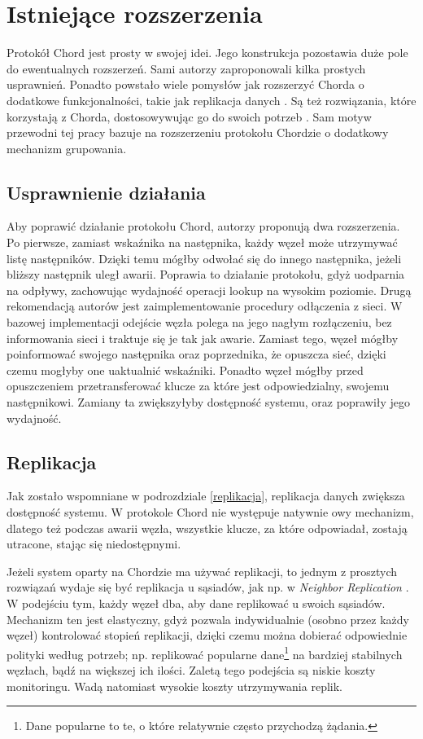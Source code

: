 \documentclass[12pt, twoside, openany]{report}
\begin{document}
\section{Istniejące rozszerzenia}

Protokół Chord jest prosty w swojej idei. Jego konstrukcja pozostawia duże pole do ewentualnych rozszerzeń. Sami autorzy zaproponowali kilka prostych usprawnień. Ponadto powstało wiele pomysłów jak rozszerzyć Chorda o dodatkowe funkcjonalności, takie jak replikacja danych \cite{bib:paiva}. Są też rozwiązania, które korzystają z Chorda, dostosowywując go do swoich potrzeb \cite{bib:tac, bib:rollerchain}. Sam motyw przewodni tej pracy bazuje na rozszerzeniu protokołu Chordzie o dodatkowy mechanizm grupowania.

\subsection{Usprawnienie działania}

Aby poprawić działanie protokołu Chord, autorzy proponują dwa rozszerzenia. Po pierwsze, zamiast wskaźnika na następnika, każdy węzeł może utrzymywać listę następników. Dzięki temu mógłby odwołać się do innego następnika, jeżeli bliższy następnik uległ awarii. Poprawia to działanie protokołu, gdyż uodparnia na odpływy, zachowując wydajność operacji lookup na wysokim poziomie. Drugą rekomendacją autorów jest zaimplementowanie procedury odłączenia z sieci. W bazowej implementacji odejście węzła polega na jego nagłym rozłączeniu, bez informowania sieci i traktuje się je tak jak awarie. Zamiast tego, węzeł mógłby poinformować swojego następnika oraz poprzednika, że opuszcza sieć, dzięki czemu mogłyby one uaktualnić wskaźniki. Ponadto węzeł mógłby przed opuszczeniem przetransferować klucze za które jest odpowiedzialny, swojemu następnikowi. Zamiany ta zwiększyłyby dostępność systemu, oraz poprawiły jego wydajność.

\subsection{Replikacja}

Jak zostało wspomniane w podrozdziale \ref{replikacja}, replikacja danych zwiększa dostępność systemu. W protokole Chord nie występuje natywnie owy mechanizm, dlatego też podczas awarii węzła, wszystkie klucze, za które odpowiadał, zostają utracone, stając się niedostępnymi. 

Jeżeli system oparty na Chordzie ma używać replikacji, to jednym z prosztych rozwiązań wydaje się być replikacja u sąsiadów, jak np. w \textit{Neighbor Replication} \cite{bib:paiva}. W podejściu tym, każdy węzeł dba, aby dane replikować u swoich sąsiadów. Mechanizm ten jest elastyczny, gdyż pozwala indywidualnie (osobno przez każdy węzeł) kontrolować stopień replikacji, dzięki czemu można dobierać odpowiednie polityki według potrzeb; np. replikować popularne dane\footnote{Dane popularne to te, o które relatywnie często przychodzą żądania.} na bardziej stabilnych węzłach, bądź na większej ich ilości. Zaletą tego podejścia są niskie koszty monitoringu. Wadą natomiast wysokie koszty utrzymywania replik.
\end{document}
